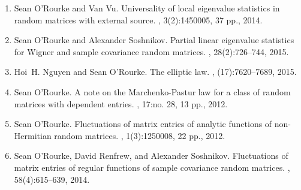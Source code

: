 \documentclass[letterpaper]{article}
\begin{document}
\begin{enumerate}
	\item Sean O'Rourke and Van Vu.
	\newblock Universality of local eigenvalue statistics in random matrices with external source.
	, 3(2):1450005, 37 pp., 2014.
	\item Sean O'Rourke and Alexander Soshnikov.
	\newblock Partial linear eigenvalue statistics for {W}igner and sample covariance random matrices.
	, 28(2):726--744, 2015.
	\item Hoi~H. Nguyen and Sean O'Rourke.
	\newblock The elliptic law.
	, (17):7620--7689, 2015.
	\item Sean O'Rourke.
	\newblock A note on the {M}archenko-{P}astur law for a class of random matrices with dependent entries.
	, 17:no. 28, 13 pp., 2012.
	\item Sean O'Rourke.
	\newblock Fluctuations of matrix entries of analytic functions of non-{H}ermitian random matrices.
	, 1(3):1250008, 22 pp., 2012.
	\item Sean O'Rourke, David Renfrew, and Alexander Soshnikov.
	\newblock Fluctuations of matrix entries of regular functions of sample covariance random matrices.
	, 58(4):615--639, 2014.

\end{enumerate}
\end{document}
